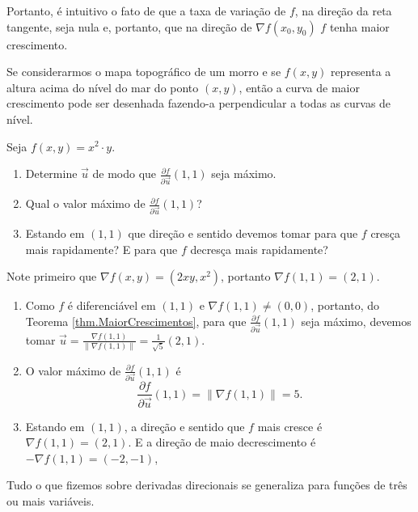 Portanto, é intuitivo o fato de que a taxa de variação de \(f\), na direção da reta tangente, seja nula e, portanto, que na direção de \(\nabla f(x_0,y_0)\) \(f\) tenha maior crescimento.

\begin{example}
    Se considerarmos o mapa topográfico de um morro e se \(f(x,y)\) representa a altura acima do nível do mar do ponto \((x,y)\), então a curva de maior crescimento pode ser desenhada fazendo-a perpendicular a todas as curvas de nível.
\end{example}

\begin{example}
    Seja \(f(x,y) = x^2\cdot y\).
        \begin{enumerate}
            \item Determine \(\overrightarrow{u}\) de modo que \(\frac{\partial f}{\partial \overrightarrow{u}}(1,1)\) seja máximo.
            \item Qual o valor máximo de \(\frac{\partial f}{\partial \overrightarrow{u}}(1,1)\)?
            \item Estando em \((1,1)\) que direção e sentido devemos tomar para que \(f\) cresça mais rapidamente? E para que \(f\) decresça mais rapidamente?
        \end{enumerate}

    Note primeiro que \(\nabla f(x,y) = (2xy,x^2)\), portanto \(\nabla f(1,1) = (2,1)\).
        \begin{enumerate}
            \item Como \(f\) é diferenciável em \((1,1)\) e \(\nabla f(1,1)\neq(0,0)\), portanto, do Teorema \ref{thm.MaiorCrescimentos}, para que \(\frac{\partial f}{\partial\overrightarrow{u}}(1,1)\) seja máximo, devemos tomar \(\overrightarrow{u} = \frac{\nabla f(1,1)}{\|\nabla f(1,1)\|} = \frac{1}{\sqrt{5}} (2,1)\).
            \item O valor máximo de \(\frac{\partial f}{\partial \overrightarrow{u}}(1,1)\) é \[\frac{\partial f}{\partial \overrightarrow{u}}(1,1) = \|\nabla f(1,1)\| = 5.\]
            \item Estando em \((1,1)\), a direção e sentido que \(f\) mais cresce é \(\nabla f(1,1) = (2,1)\). E a direção de maio decrescimento é \(-\nabla f(1,1) = (-2,-1)\),
        \end{enumerate}
\end{example}

\begin{remark}
    Tudo o que fizemos sobre derivadas direcionais se generaliza para funções de três ou mais variáveis.
\end{remark}

